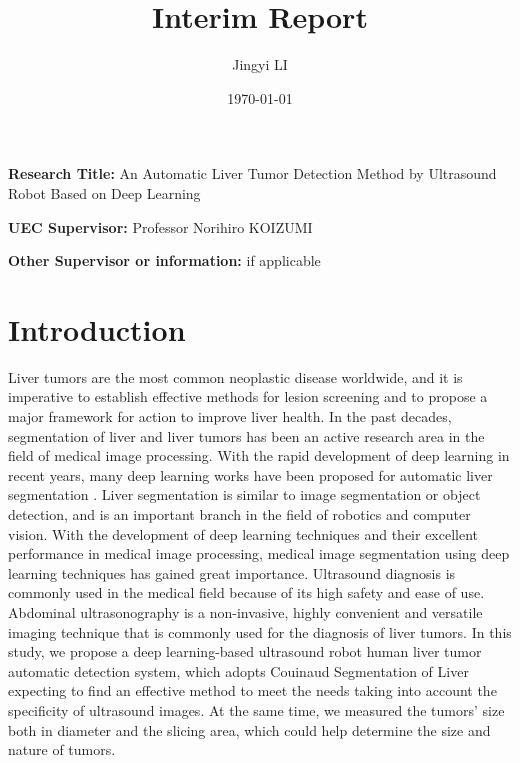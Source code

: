 \documentclass[12pt, a4paper]{article}
\title{Interim Report}
\author{Jingyi LI}
\date{\today}
\newcommand{\namelistlabel}[1]{\mbox{#1}\hfil}
\newenvironment{namelist}[1]{%
\begin{list}{}
    {
        \let\makelabel\namelistlabel
        \settowidth{\labelwidth}{#1}
        \setlength{\leftmargin}{1.1\labelwidth}
    }
  }{%
\end{list}}
\begin{document}
\maketitle

\begin{namelist}{xxxxxxxxxxxx}
\item[{\bf Research Title:}]
An Automatic Liver Tumor Detection Method by Ultrasound Robot Based on Deep Learning
\item[{\bf UEC Supervisor:}]
	Professor Norihiro KOIZUMI
	\item[{\bf Other Supervisor or information:}]
	if applicable
\end{namelist}


\section{Introduction}

Liver tumors are the most common neoplastic disease worldwide, and it is imperative to establish effective methods for lesion screening and to propose a major framework for action to improve liver health. In the past decades, segmentation of liver and liver tumors has been an active research area in the field of medical image processing. With the rapid development of deep learning in recent years, many deep learning works have been proposed for automatic liver segmentation \cite{1,2}. Liver segmentation is similar to image segmentation or object detection, and is an important branch in the field of robotics and computer vision. With the development of deep learning techniques and their excellent performance in medical image processing, medical image segmentation using deep learning techniques has gained great importance. Ultrasound diagnosis is commonly used in the medical field because of its high safety and ease of use. Abdominal ultrasonography is a non-invasive, highly convenient and versatile imaging technique that is commonly used for the diagnosis of liver tumors. In this study, we propose a deep learning-based ultrasound robot human liver tumor automatic detection system, which adopts Couinaud Segmentation of Liver\cite{3} expecting to find an effective method to meet the needs taking into account the specificity of ultrasound images. At the same time, we measured the tumors' size both in diameter and the slicing area, which could help determine the size and nature of tumors.

\end{document}

